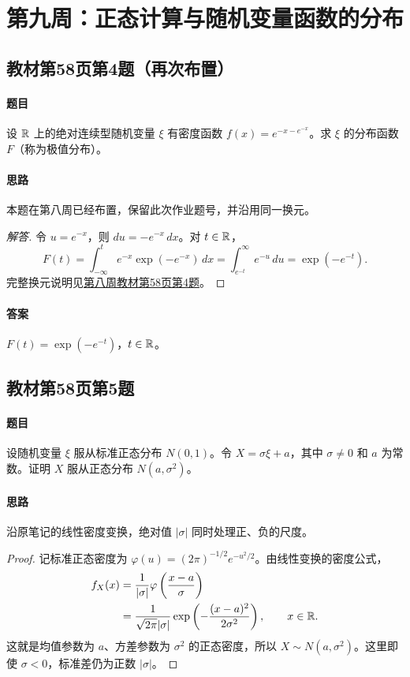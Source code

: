 \section{第九周：正态计算与随机变量函数的分布}

\subsection{教材第58页第4题（再次布置）}\label{ex:w09-b58-4}
\paragraph{题目}
设 $\mathbb R$ 上的绝对连续型随机变量 $\xi$ 有密度函数 $f(x)=e^{-x-e^{-x}}$。求 $\xi$ 的分布函数 $F$（称为极值分布）。
\paragraph{思路} 本题在第八周已经布置，保留此次作业题号，并沿用同一换元。
\begin{proof}[解答]
令 $u=e^{-x}$，则 $du=-e^{-x}\,dx$。对 $t\in\mathbb R$，
\[
F(t)=\int_{-\infty}^{t}e^{-x}\exp(-e^{-x})\,dx
=\int_{e^{-t}}^{\infty}e^{-u}\,du
=\exp(-e^{-t}).
\]
完整换元说明见\hyperref[ex:w08-b58-4]{第八周教材第58页第4题}。
\end{proof}
\paragraph{答案} $F(t)=\exp(-e^{-t})$，$t\in\mathbb R$。

\subsection{教材第58页第5题}\label{ex:w09-b58-5}
\paragraph{题目}
设随机变量 $\xi$ 服从标准正态分布 $N(0,1)$。令 $X=\sigma\xi+a$，其中 $\sigma\ne0$ 和 $a$ 为常数。证明 $X$ 服从正态分布 $N(a,\sigma^2)$。
\paragraph{思路} 沿原笔记的线性密度变换，绝对值 $|\sigma|$ 同时处理正、负的尺度。
\begin{proof}
记标准正态密度为 $\varphi(u)=(2\pi)^{-1/2}e^{-u^2/2}$。由线性变换的密度公式，
\begin{align*}
f_X(x)
&=\frac1{|\sigma|}\varphi\left(\frac{x-a}{\sigma}\right)\\
&=\frac1{\sqrt{2\pi}|\sigma|}
\exp\left(-\frac{(x-a)^2}{2\sigma^2}\right),\qquad x\in\mathbb R.
\end{align*}
这就是均值参数为 $a$、方差参数为 $\sigma^2$ 的正态密度，所以 $X\sim N(a,\sigma^2)$。这里即使 $\sigma<0$，标准差仍为正数 $|\sigma|$。
\end{proof}
